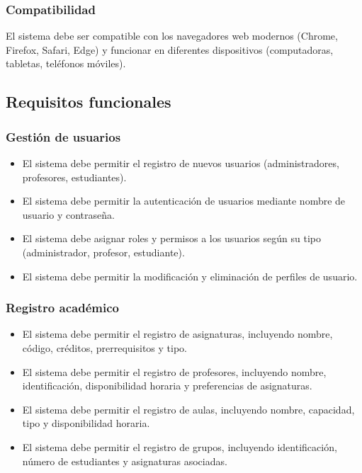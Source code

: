 \documentclass{article} %
\begin{document}
    \subsubsection{Compatibilidad}
    \noindent
    El sistema debe ser compatible con los navegadores web modernos (Chrome, Firefox, Safari, Edge) y funcionar en diferentes dispositivos (computadoras, tabletas, teléfonos móviles).

\subsection{Requisitos funcionales}
    \subsubsection{Gestión de usuarios}
    \begin{itemize}
        \item El sistema debe permitir el registro de nuevos usuarios (administradores, profesores, estudiantes).
        \item El sistema debe permitir la autenticación de usuarios mediante nombre de usuario y contraseña.
        \item El sistema debe asignar roles y permisos a los usuarios según su tipo (administrador, profesor, estudiante).
        \item El sistema debe permitir la modificación y eliminación de perfiles de usuario.
    \end{itemize}
    
    \subsubsection{Registro académico}
    \begin{itemize}
        \item El sistema debe permitir el registro de asignaturas, incluyendo nombre, código, créditos, prerrequisitos y tipo.
        \item El sistema debe permitir el registro de profesores, incluyendo nombre, identificación, disponibilidad horaria y preferencias de asignaturas.
        \item El sistema debe permitir el registro de aulas, incluyendo nombre, capacidad, tipo y disponibilidad horaria.
        \item El sistema debe permitir el registro de grupos, incluyendo identificación, número de estudiantes y asignaturas asociadas.
    \end{itemize}
    
\end{document}
